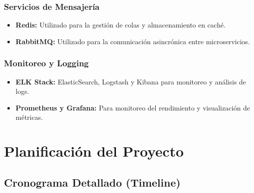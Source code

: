\documentclass{article}
\begin{document}
\subsubsection{Servicios de Mensajería}
\begin{itemize}
    \item \textbf{Redis:} Utilizado para la gestión de colas y almacenamiento en caché.
    \item \textbf{RabbitMQ:} Utilizado para la comunicación asincrónica entre microservicios.
\end{itemize}

\subsubsection{Monitoreo y Logging}
\begin{itemize}
    \item \textbf{ELK Stack:} ElasticSearch, Logstash y Kibana para monitoreo y análisis de logs.
    \item \textbf{Prometheus y Grafana:} Para monitoreo del rendimiento y visualización de métricas.
\end{itemize}
\newpage

\section{Planificación del Proyecto}

\subsection{Cronograma Detallado (Timeline)}
\end{document}
